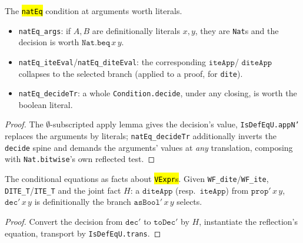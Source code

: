 \begin{lemma}
  \label{prim-cond:family:condition-nateq-eval}
  \leanok

   The \hl{\texttt{natEq}} condition at arguments worth literals.
  \begin{itemize}
  \item \texttt{natEq\_args}: if $A, B$ are definitionally literals $x, y$, they are \texttt{Nat}s
    and the decision is worth $\mathtt{Nat.beq}\,x\,y$.
  \item \texttt{natEq\_iteEval}/\texttt{natEq\_diteEval}: the corresponding $\mathtt{iteApp}$/
    $\mathtt{diteApp}$ collapses to the selected branch (applied to a proof, for \texttt{dite}).
  \item \texttt{natEq\_decideTr}: a whole \texttt{Condition.decide}, under any closing, is worth
    the boolean literal.
  \end{itemize}
\end{lemma}
\begin{proof}
  \leanok
   The $\emptyset$-subscripted apply lemma gives the decision's value, \texttt{IsDefEqU.appN'} replaces
  the arguments by literals; \texttt{natEq\_decideTr} additionally inverts the \texttt{decide}
  spine and demands the arguments' values at \emph{any} translation, composing with
  \texttt{Nat.bitwise}'s own reflected test.
\end{proof}

\begin{lemma}
  \label{prim-cond:family:condition-reflect-eval}
  \leanok

   The conditional equations as facts about \hl{\texttt{VExpr}s}.
  Given \texttt{WF\_dite}/\texttt{WF\_ite}, \texttt{DITE\_T}/\texttt{ITE\_T} and the joint fact $H$:
  a $\mathtt{diteApp}$ (resp.\ $\mathtt{iteApp}$) from $\mathtt{prop}'\,x\,y$, $\mathtt{dec}'\,x\,y$
  is definitionally the branch $\mathtt{asBool}'\,x\,y$ selects.
\end{lemma}
\begin{proof}
  \leanok
   Convert the decision from $\mathtt{dec}'$ to $\mathtt{toDec}'$ by $H$, instantiate
  the reflection's equation, transport by \texttt{IsDefEqU.trans}.
\end{proof}

